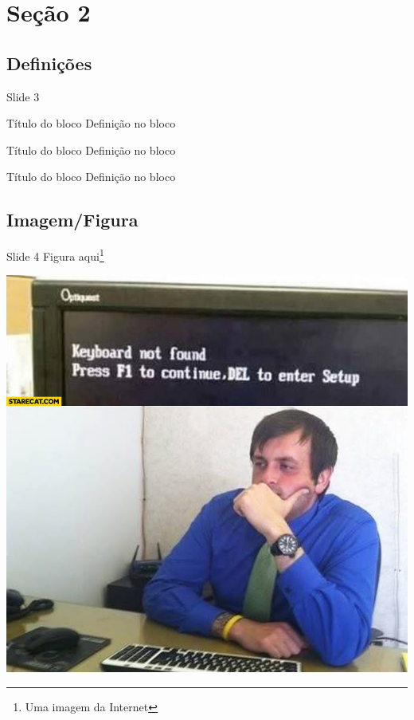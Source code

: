 \documentclass[xcolor=dvipsnames,table]{beamer}
\begin{document}
\section{Seção 2}
\subsection{Definições}
\begin{frame}{Slide 3}
	\begin{block}{Título do bloco}
		Definição no bloco
	\end{block}

	\begin{exampleblock}{Título do bloco}
		Definição no bloco
	\end{exampleblock}

	\begin{alertblock}{Título do bloco}
		Definição no bloco
	\end{alertblock}
\end{frame}

\subsection{Imagem/Figura}
\begin{frame}{Slide 4}
	Figura aqui\footnote{Uma imagem da Internet}

	\begin{center}
		\includegraphics[scale=0.25]{bios2.jpg}
	\end{center}
\end{frame}
\end{document}
